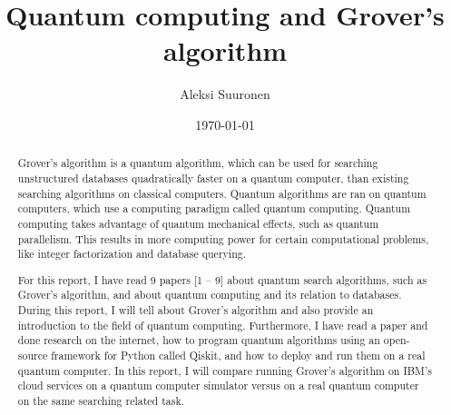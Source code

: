 \documentclass[english,oneside,openright]{UH_DS_report}
\title{Quantum computing and Grover's algorithm}
\author{Aleksi Suuronen}
\date{\today}
\begin{document}
\maketitle


\begin{abstract} 

Grover's algorithm is a quantum algorithm, which can be used for searching unstructured databases quadratically faster on a quantum computer, than existing searching algorithms on classical computers. Quantum algorithms are ran on quantum computers, which use a computing paradigm called quantum computing. Quantum computing takes advantage of quantum mechanical effects, such as quantum parallelism. This results in more computing power for certain computational problems, like integer factorization and database querying.

For this report, I have read 9 papers [1 -- 9] about quantum search algorithms, such as Grover's algorithm, and about quantum computing and its relation to databases. During this report, I will tell about Grover's algorithm and also provide an introduction to the field of quantum computing. Furthermore, I have read a paper and done research on the internet, how to program quantum algorithms using an open-source framework for Python called Qiskit, and how to deploy and run them on a real quantum computer. In this report, I will compare running Grover's algorithm on IBM's cloud services on a quantum computer simulator versus on a real quantum computer on the same searching related task.

\end{abstract}

\mytableofcontents

\mynomenclature

\end{document}
